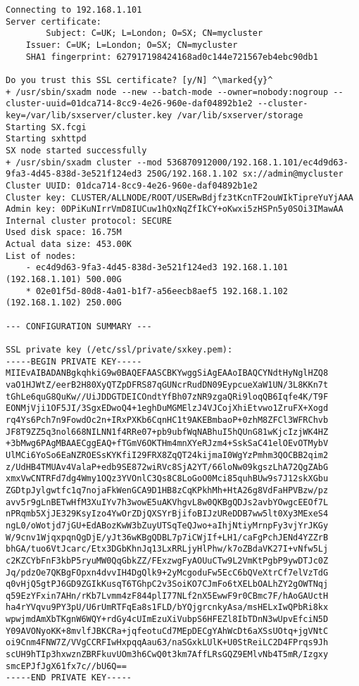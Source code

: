 \begin{lstlisting}
Connecting to 192.168.1.101
Server certificate:
        Subject: C=UK; L=London; O=SX; CN=mycluster
	Issuer: C=UK; L=London; O=SX; CN=mycluster
	SHA1 fingerprint: 627917198424168ad0c144e721567eb4ebc90db1

Do you trust this SSL certificate? [y/N] ^\marked{y}^
+ /usr/sbin/sxadm node --new --batch-mode --owner=nobody:nogroup --cluster-uuid=01dca714-8cc9-4e26-960e-daf04892b1e2 --cluster-key=/var/lib/sxserver/cluster.key /var/lib/sxserver/storage
Starting SX.fcgi
Starting sxhttpd
SX node started successfully
+ /usr/sbin/sxadm cluster --mod 536870912000/192.168.1.101/ec4d9d63-9fa3-4d45-838d-3e521f124ed3 250G/192.168.1.102 sx://admin@mycluster
Cluster UUID: 01dca714-8cc9-4e26-960e-daf04892b1e2
Cluster key: CLUSTER/ALLNODE/ROOT/USERwBdjfz3tKcnTF2ouWIkTipreYuYjAAA
Admin key: 0DPiKuNIrrVmD8IUCuw1hQxNqZfIkCY+oKwxi5zHSPn5y0SOi3IMawAA
Internal cluster protocol: SECURE
Used disk space: 16.75M
Actual data size: 453.00K
List of nodes:
    - ec4d9d63-9fa3-4d45-838d-3e521f124ed3 192.168.1.101 (192.168.1.101) 500.00G
    * 02e01f5d-80d8-4a01-b1f7-a56eecb8aef5 192.168.1.102 (192.168.1.102) 250.00G

--- CONFIGURATION SUMMARY ---

SSL private key (/etc/ssl/private/sxkey.pem):
-----BEGIN PRIVATE KEY-----
MIIEvAIBADANBgkqhkiG9w0BAQEFAASCBKYwggSiAgEAAoIBAQCYNdtHyNglHZQ8
vaO1HJWtZ/eerB2H80XyQTZpDFRS87qGUNcrRudDN09EypcueXaW1UN/3L8KKn7t
tGhLe6quG8QuKw//UiJDDGTDEICOndtYfBh07zNR9zgaQRi9loqQB6Iqfe4K/T9F
EONMjVji1OF5JI/3SgxEDwoQ4+1eghDuMGMElzJ4VJCojXhiEtvwo1ZruFX+Xogd
rq4Ys6Pch7n9FowdOc2n+IRxPXKb6CqnHC1t9AKEBmbaoP+0zhM8ZFCl3WFRChvb
JF8T9ZZ5q3nol668NILNN1f4RRe07+pb9ubfWqNABhuI5hQUnG81wKjcIzjWK4HZ
+3bMwg6PAgMBAAECggEAQ+fTGmV6OKTHm4mnXYeRJzm4+SskSaC41elOEvOTMybV
UlMCi6YoSo6EaNZROESsKYKfiI29FRX8ZqQT24kijmaI0WgYzPmhm3QOCBB2qim2
z/UdHB4TMUAv4ValaP+edb9SE872wiRVc8SjA2YT/66loNw09kgszLhA72QgZAbG
xmxVwCNTRFd7dg4Wmy1OQz3YVOnlC3Qs8C8LoGoO0Mci85quhBUw9s7J12skXGbu
ZGDtpJylgwtfc1q7nojaFkWenGCA9D1HB8zCqKPkhMh+HtA26g8VdFaHPVBzw/pz
avv5r9gLnBETwHfM3XuIYv7h3wowE5uAKVhgvL8w0QKBgQDJs2avbYOwgcEEOf7L
nPRqmb5XjJE329KsyIzo4YwOrZDjQXSYrBjifoBIJzUReDDB7ww5lt0Xy3MExeS4
ngL0/oWotjd7jGU+EdABozKwW3bZuyUTSqTeQJwo+aIhjNtiyMrnpFy3vjYrJKGy
W/9cnv1WjqxpqnQgDjE/yJt36wKBgQDBL7p7iCWjIf+LH1/caFgPchJENd4YZZrB
bhGA/tuo6VtJcarc/Etx3DGbKhnJq13LxRRLjyHlPhw/k7oZBdaVK27I+vNfw5Lj
c2KZCYbFnF3kbP5ryuMW0QqGbkZZ/FExzwgFyAOUuCTw9L2VmKtPgbP9ywDTJc0Z
Jq/pdzOe7QKBgFOpxn4dvvIH4DgQlk9+2yMcgoduFw5EcC6bQVeXtrCf7elVzTdG
q0vHjQ5gtPJ6GD9ZGIkKusqT6TGhpC2v3SoiKO7CJmFo6tXELbOALhZY2gOWTNqj
q59EzYFxin7AHn/rKb7Lvmm4zF844plI77NLf2nX5EwwF9r0CBmc7F/hAoGAUctH
ha4rYVqvu9PY3pU/U6rUmRTFqEa8s1FLD/bYQjgrcnkyAsa/msHELxIwQPbRi8kx
wpwjmdAmXbTKgnW6WQY+rdGy4cUImEzuXiVubpS6HFEZl8IbTDnN3wUpvEfciN5D
Y09AVONyoKK+8mvlfJBKCRa+jqfeotuCd7MEpDECgYAhWcDt6aXSsUOtq+jgVNtC
oi9Cnm4FNW7Z/VVgCCRFIwHxpqqAau63/naSGxkLUlK+U0StReiLC2D4FPrqs9Jh
scUH9hTIp3hxwznZBRFkuvUOm3h6CwQ0t3km7AffLRsGQZ9EMlvNb4T5mR/Izgxy
smcEPJfJgX61fx7c//bU6Q==
-----END PRIVATE KEY-----



\end{lstlisting}
